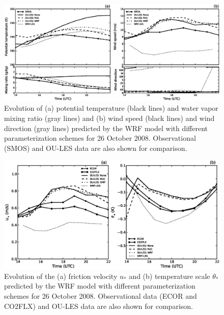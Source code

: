 \begin{figure}[H]
\begin{center}
\includegraphics[width=\textwidth]{figures/chapter6/meteogram_20081026}
\end{center}
\caption{Evolution of (a) potential temperature (black lines) and water vapor mixing ratio (gray lines) and (b) wind speed (black lines) and wind direction (gray lines) predicted by the WRF model with different parameterization schemes for 26 October 2008. Observational (SMOS) and OU-LES data are also shown for comparison.}
\label{figure615}
\end{figure}



\begin{figure}[H]
\begin{center}
\includegraphics[width=\textwidth]{figures/chapter6/ust_tst_20081026}
\end{center}
\caption{Evolution of the (a) friction velocity $u_*$ and (b) temperature scale $\theta_*$ predicted by the WRF model with different parameterization schemes for 26 October 2008. Observational data (ECOR and CO2FLX) and OU-LES data are also shown for comparison.}
\label{figure616}
\end{figure}


